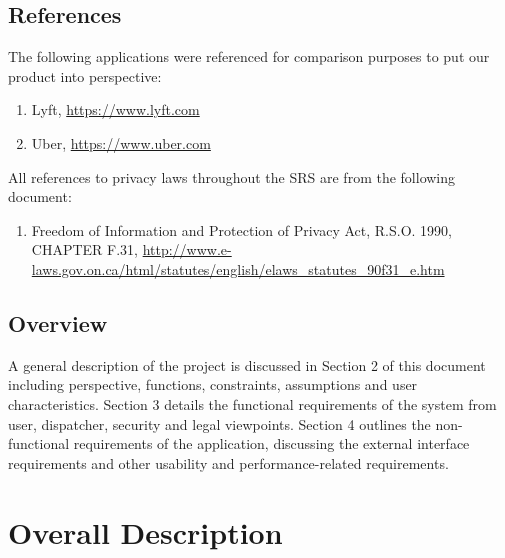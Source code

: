 \documentclass[english]{article}
\begin{document}
\subsection{References}
\label{sub:references}
The following applications were referenced for comparison purposes to put our product into perspective:
\begin{enumerate}
	\item Lyft, \url{https://www.lyft.com}
	\item Uber, \url{https://www.uber.com}
\end{enumerate}
All references to privacy laws throughout the SRS are from the following document:
\begin{enumerate}
	\item Freedom of Information and Protection of Privacy Act, R.S.O. 1990, CHAPTER F.31, \url{http://www.e-laws.gov.on.ca/html/statutes/english/elaws_statutes_90f31_e.htm}
\end{enumerate}


\subsection{Overview}
\label{sub:overview}
A general description of the project is discussed in Section 2 of this document including perspective, functions, constraints, assumptions and user characteristics. Section 3 details the functional requirements of the system from user, dispatcher, security and legal viewpoints. Section 4 outlines the non-functional requirements of the application, discussing the external interface requirements and other usability and performance-related requirements.


\section{Overall Description}
\label{sec:overall_description}
\end{document}
